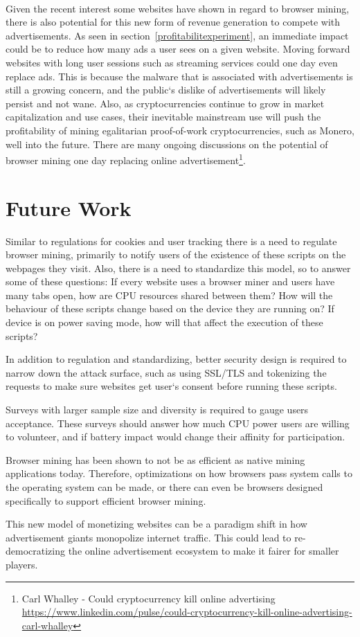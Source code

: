 \\
Given the recent interest some websites have shown in regard to browser mining, there is also potential for this new form of revenue generation to compete with advertisements. As seen in section~\ref{profitabilitexperiment}, an immediate impact could be to reduce how many ads a user sees on a given website. Moving forward websites with long user sessions such as streaming services could one day even replace ads. This is because the malware that is associated with advertisements is still a growing concern, and the public`s dislike of advertisements will likely persist and not wane. Also, as cryptocurrencies continue to grow in market capitalization and use cases, their inevitable mainstream use will push the profitability of mining egalitarian proof-of-work cryptocurrencies, such as Monero, well into the future. There are many ongoing discussions on the potential of browser mining one day replacing online advertisement\footnote{Carl Whalley - Could cryptocurrency kill online advertising \url{https://www.linkedin.com/pulse/could-cryptocurrency-kill-online-advertising-carl-whalley}}.

\section{Future Work}
Similar to regulations for cookies and user tracking there is a need to regulate browser mining, primarily to notify users of the existence of these scripts on the webpages they visit. Also, there is a need to standardize this model, so to answer some of these questions: If every website uses a browser miner and users have many tabs open, how are CPU resources shared between them? How will the behaviour of these scripts change based on the device they are running on? If device is on power saving mode, how will that affect the execution of these scripts?

In addition to regulation and standardizing, better security design is required to narrow down the attack surface, such as using SSL/TLS and tokenizing the requests to make sure websites get user`s consent before running these scripts. 

Surveys with larger sample size and diversity is required to gauge users acceptance. These surveys should answer how much CPU power users are willing to volunteer, and if battery impact would change their affinity for participation.

Browser mining has been shown to not be as efficient as native mining applications today. Therefore, optimizations on how browsers pass system calls to the operating system can be made, or there can even be browsers designed specifically to support efficient browser mining.

This new model of monetizing websites can be a paradigm shift in how advertisement giants monopolize internet traffic. This could lead to re-democratizing the online advertisement ecosystem to make it fairer for smaller players.


